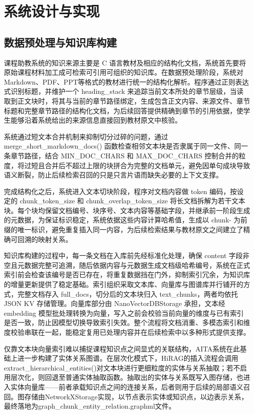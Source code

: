 \chapter{系统设计与实现}

\section{数据预处理与知识库构建}
课程助教系统的知识来源主要是 C 语言教材及相应的结构化文档，系统首先要将原始课程材料加工成可检索可引用可组织的知识库。在数据预处理阶段，系统对Markdown、PDF、PPT等格式的教材进行统一的结构化解析。程序通过正则表达式识别标题，并维护一个 heading_stack 来追踪当前文本所处的章节层级，当读取到正文块时，将其与当前的章节路径绑定，生成包含正文内容、来源文件、章节标题和完整章节路径的结构化文档，为后续回答提供精确到章节的引用依据，使学生能够沿着系统给出的来源信息直接回到教材原文中核验。

系统通过短文本合并机制来抑制切分过碎的问题，通过 merge_short_markdown_docs() 函数检查相邻文本块是否隶属于同一文件、同一条章节路径，结合 MIN_DOC_CHARS 和 MAX_DOC_CHARS 控制合并的粒度，将过短且合并后不超过上限的块拼合为完整的文档单元，避免因单句成块导致语义断裂，防止后续检索召回的只是只言片语而缺失必要的上下文支撑。

完成结构化之后，系统进入文本切块阶段，程序对文档内容做 token 编码，按设定的 chunk_token_size 和  chunk_overlap_token_size 将长文档拆解为若干文本块。每个块均保留文档编号、块序号、文本内容等基础字段，并继承前一阶段生成的元数据，为保证标识稳定，系统依据这些内容计算哈希值，生成以 chunk- 为前缀的唯一标识，避免重复插入同一内容，为后续检索结果与教材原文之间建立了精确可回溯的映射关系。

知识库构建的过程中，每一条文档在入库前先经标准化处理，确保 content 字段非空且元数据完整可追溯，随后依据内容与元数据生成文档级哈希编号，系统在正式索引前会检查该编号是否已存在，将重复数据挡在门外，抑制索引冗余，为知识库的增量更新提供了稳定基础。索引组织采取文本库、向量库与图谱库并行铺开的方式，完整文档存入 full_docs，切分后的文本块归入 text_chunks，两者均依托 JSON KV 存储管理。向量库部分由 NanoVectorDBStorage 承担，文本经 embedding 模型批处理转换为向量，写入之前会校验当前向量的维度与已有索引是否一致，防止因模型切换导致索引失效。整个流程将文档消重、多模态索引和维度校验串联在一起，能稳定复用已处理内容并在后续检索中以多种形式提供支撑。

仅靠文本块向量索引难以捕捉课程知识点之间显式的关联结构，AITA系统在此基础上进一步构建了实体关系图谱。在层次化模式下，HiRAG的插入流程会调用extract_hierarchical_entities()对文本块进行更细粒度的实体与关系抽取；若不启用层次化，则回退至普通实体抽取函数。抽取出的实体与关系既写入图存储，也进入实体向量库——前者承载知识点之间的连接关系，后者则用于后续的局部语义召回。图存储由NetworkXStorage实现，以节点表示实体或知识点，以边表示关系，最终落地为graph_chunk_entity_relation.graphml文件。

